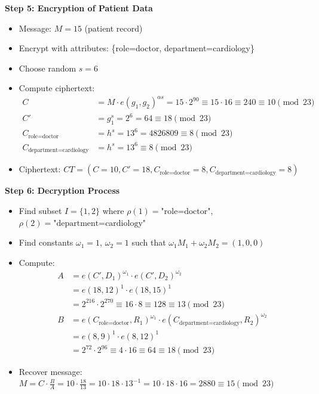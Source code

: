 \documentclass[11pt,a4paper]{article}
\begin{document}
\begin{mathbox}
\textbf{Step 5: Encryption of Patient Data}
\begin{itemize}
    \item Message: $M = 15$ (patient record)
    \item Encrypt with attributes: \{role=doctor, department=cardiology\}
    \item Choose random $s = 6$
    \item Compute ciphertext:
    \begin{align*}
    C &= M \cdot e(g_1, g_2)^{\alpha s} = 15 \cdot 2^{90} \equiv 15 \cdot 16 \equiv 240 \equiv 10 \pmod{23} \\
    C' &= g_1^s = 2^6 = 64 \equiv 18 \pmod{23} \\
    C_{\text{role=doctor}} &= h^s = 13^6 = 4826809 \equiv 8 \pmod{23} \\
    C_{\text{department=cardiology}} &= h^s = 13^6 \equiv 8 \pmod{23}
    \end{align*}
    \item Ciphertext: $CT = (C = 10, C' = 18, C_{\text{role=doctor}} = 8, C_{\text{department=cardiology}} = 8)$
\end{itemize}
\end{mathbox}

\begin{mathbox}
\textbf{Step 6: Decryption Process}
\begin{itemize}
    \item Find subset $I = \{1, 2\}$ where $\rho(1) = \text{"role=doctor"}$, $\rho(2) = \text{"department=cardiology"}$
    \item Find constants $\omega_1 = 1$, $\omega_2 = 1$ such that $\omega_1 M_1 + \omega_2 M_2 = (1, 0, 0)$
    \item Compute:
    \begin{align*}
    A &= e(C', D_1)^{\omega_1} \cdot e(C', D_2)^{\omega_2} \\
    &= e(18, 12)^1 \cdot e(18, 15)^1 \\
    &= 2^{216} \cdot 2^{270} \equiv 16 \cdot 8 \equiv 128 \equiv 13 \pmod{23} \\
    B &= e(C_{\text{role=doctor}}, R_1)^{\omega_1} \cdot e(C_{\text{department=cardiology}}, R_2)^{\omega_2} \\
    &= e(8, 9)^1 \cdot e(8, 12)^1 \\
    &= 2^{72} \cdot 2^{96} \equiv 4 \cdot 16 \equiv 64 \equiv 18 \pmod{23}
    \end{align*}
    \item Recover message: $M = C \cdot \frac{B}{A} = 10 \cdot \frac{18}{13} = 10 \cdot 18 \cdot 13^{-1} = 10 \cdot 18 \cdot 16 = 2880 \equiv 15 \pmod{23}$
\end{itemize}
\end{mathbox}
\end{document}
